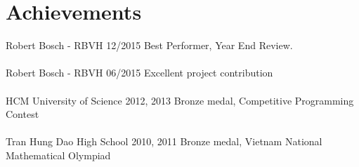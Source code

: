 \section*{Achievements}
{%
  \event
  {Robert Bosch - RBVH}
  {12/2015}
  {Best Performer, Year End Review.}
  \\
  \\
  \event
  {Robert Bosch - RBVH}
  {06/2015}
  {Excellent project contribution}
  \\
  \\
  \event
  {HCM University of Science}
  {2012, 2013}
  {Bronze medal, Competitive Programming Contest}
  \\
  \\
  \event
  {Tran Hung Dao High School}
  {2010, 2011}
  {Bronze medal, Vietnam National Mathematical Olympiad}
}%
